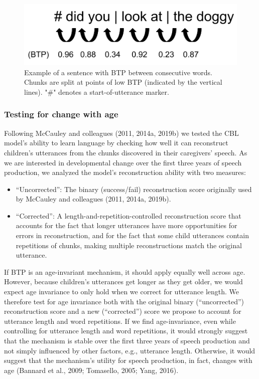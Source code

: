 \documentclass[
  english,
  man,floatsintext]{apa6}
\providecommand{\tightlist}{%
  \setlength{\itemsep}{0pt}\setlength{\parskip}{0pt}}
\begin{document}
\begin{figure}
\includegraphics[width=0.75\linewidth]{images/chunking_mechanism} \caption{Example of a sentence with BTP between consecutive words. Chunks are split at points of low BTP (indicated by the vertical lines). "\#" denotes a start-of-utterance marker.}\label{fig:fig1}
\end{figure}

\hypertarget{testing-for-change-with-age}{%
\subsubsection{Testing for change with age}\label{testing-for-change-with-age}}

Following McCauley and colleagues (2011, 2014a, 2019b) we tested the CBL model's ability to learn language by checking how well it can reconstruct children's utterances from the chunks discovered in their caregivers' speech. As we are interested in developmental change over the first three years of speech production, we analyzed the model's reconstruction ability with two measures:

\begin{itemize}
\tightlist
\item
  \enquote{Uncorrected}: The binary (success/fail) reconstruction score originally used by McCauley and colleagues (2011, 2014a, 2019b).
\item
  \enquote{Corrected}: A length-and-repetition-controlled reconstruction score that accounts for the fact that longer utterances have more opportunities for errors in reconstruction, and for the fact that some child utterances contain repetitions of chunks, making multiple reconstructions match the original utterance.
\end{itemize}

If BTP is an age-invariant mechanism, it should apply equally well across age. However, because children's utterances get longer as they get older, we would expect age invariance to only hold when we correct for utterance length. We therefore test for age invariance both with the original binary (\enquote{uncorrected}) reconstruction score and a new (\enquote{corrected}) score we propose to account for utterance length and word repetitions. If we find age-invariance, even while controlling for utterance length and word repetitions, it would strongly suggest that the mechanism is stable over the first three years of speech production and not simply influenced by other factors, e.g., utterance length. Otherwise, it would suggest that the mechanism's utility for speech production, in fact, changes with age (Bannard et al., 2009; Tomasello, 2005; Yang, 2016).
\end{document}
